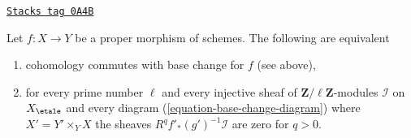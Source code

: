 \begin{lemma}
\label{etale-cohomology-lemma-proper-base-change-in-terms-of-injectives}
\href{https://stacks.math.columbia.edu/tag/0A4B}{\texttt{Stacks tag 0A4B}}

Let $f : X \to Y$ be a proper morphism of schemes.
The following are equivalent
\begin{enumerate}
\item cohomology commutes with base change for $f$ (see above),
\item for every prime number $\ell$ and every injective
sheaf of $\mathbf{Z}/\ell\mathbf{Z}$-modules $\mathcal{I}$
on $X_\etale$ and every diagram (\ref{equation-base-change-diagram})
where $X' = Y' \times_Y X$ the sheaves
$R^qf'_*(g')^{-1}\mathcal{I}$ are zero for $q > 0$.
\end{enumerate}
\end{lemma}

